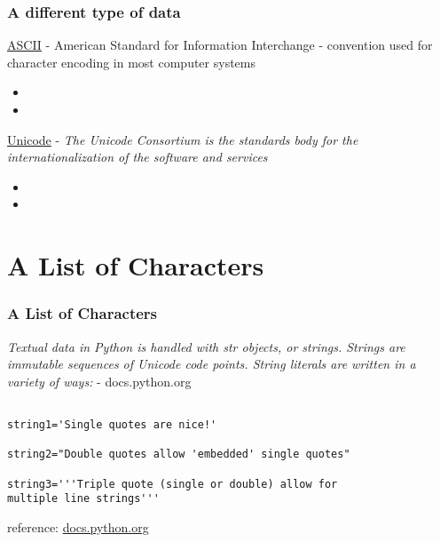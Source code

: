 \documentclass[fleqn]{beamer} %
\newcommand{\sectiontitleI}{A different type of data} %
\newcommand{\sectiontitleII}{A List of Characters }
\begin{document}
	\begin{frame} \small
		\frametitle{\sectiontitleI}
		
		\href{https://www.asciitable.com/}{ASCII} - American Standard for Information Interchange - convention used for character encoding in most computer systems

		\begin{itemize}
			\item
			\item
		\end{itemize}

		\href{https://home.unicode.org/}{Unicode} - {\it The Unicode Consortium is the standards body for the internationalization of the software and services}   

		\begin{itemize}
			\item
			\item
		\end{itemize}
		
	\end{frame}



\section{\sectiontitleII}

	\begin{frame}[label=sectionII, containsverbatim] \small
		\frametitle{\sectiontitleII}
		
		{\it Textual data in Python is handled with str objects, or strings. Strings are immutable sequences of Unicode code points. String literals are written in a variety of ways:} - docs.python.org

		\begin{lstlisting}

string1='Single quotes are nice!'

string2="Double quotes allow 'embedded' single quotes" 

string3='''Triple quote (single or double) allow for
multiple line strings'''

		\end{lstlisting}



		\tiny{reference: \href{https://docs.python.org/3/library/stdtypes.html#textseq}{docs.python.org}}
	
	\end{frame}
\end{document}
